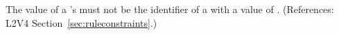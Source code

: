 The value of a \RateRule's  must not be the
identifier of a \Compartment with a 
value of .
(References: L2V4 Section~\ref{sec:ruleconstraints}.)

